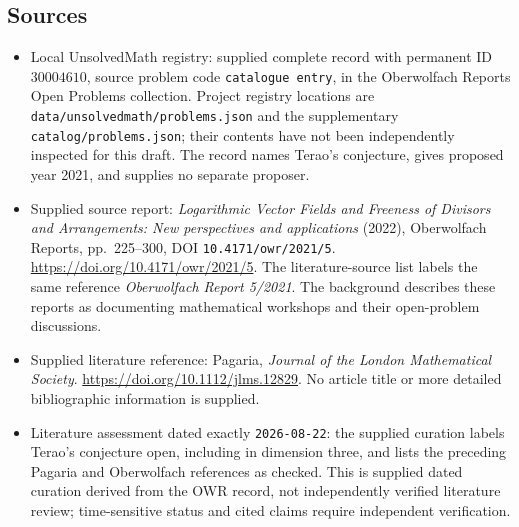 \documentclass[11pt]{article}
\begin{document}
\subsection{Sources}
\begin{itemize}
\item Local UnsolvedMath registry: supplied complete record with permanent ID \(30004610\), source problem code \texttt{catalogue entry}, in the Oberwolfach Reports Open Problems collection. Project registry locations are \texttt{data/unsolvedmath/problems.json} and the supplementary \texttt{catalog/problems.json}; their contents have not been independently inspected for this draft. The record names Terao's conjecture, gives proposed year 2021, and supplies no separate proposer.
\item Supplied source report: \emph{Logarithmic Vector Fields and Freeness of Divisors and Arrangements: New perspectives and applications} (2022), Oberwolfach Reports, pp.\ 225--300, DOI \texttt{10.4171/owr/2021/5}. \url{https://doi.org/10.4171/owr/2021/5}. The literature-source list labels the same reference \emph{Oberwolfach Report 5/2021}. The background describes these reports as documenting mathematical workshops and their open-problem discussions.
\item Supplied literature reference: Pagaria, \emph{Journal of the London Mathematical Society}. \url{https://doi.org/10.1112/jlms.12829}. No article title or more detailed bibliographic information is supplied.
\item Literature assessment dated exactly \texttt{2026-08-22}: the supplied curation labels Terao's conjecture open, including in dimension three, and lists the preceding Pagaria and Oberwolfach references as checked. This is supplied dated curation derived from the OWR record, not independently verified literature review; time-sensitive status and cited claims require independent verification.
\end{itemize}
\end{document}
